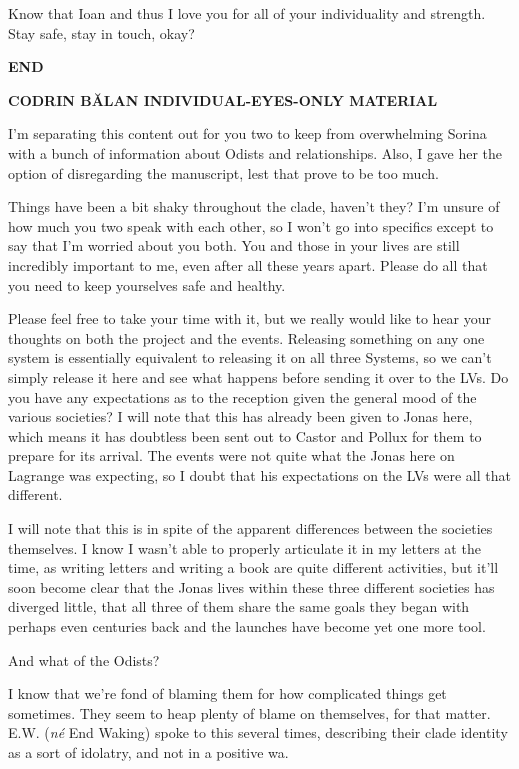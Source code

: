Know that Ioan and thus I love you for all of your individuality and strength. Stay safe, stay in touch, okay?

\textbf{END}

\textbf{CODRIN BĂLAN INDIVIDUAL-EYES-ONLY MATERIAL}

I'm separating this content out for you two to keep from overwhelming Sorina with a bunch of information about Odists and relationships. Also, I gave her the option of disregarding the manuscript, lest that prove to be too much.

Things have been a bit shaky throughout the clade, haven't they? I'm unsure of how much you two speak with each other, so I won't go into specifics except to say that I'm worried about you both. You and those in your lives are still incredibly important to me, even after all these years apart. Please do all that you need to keep yourselves safe and healthy.

Please feel free to take your time with it, but we really would like to hear your thoughts on both the project and the events. Releasing something on any one system is essentially equivalent to releasing it on all three Systems, so we can't simply release it here and see what happens before sending it over to the LVs. Do you have any expectations as to the reception given the general mood of the various societies? I will note that this has already been given to Jonas here, which means it has doubtless been sent out to Castor and Pollux for them to prepare for its arrival. The events were not quite what the Jonas here on Lagrange was expecting, so I doubt that his expectations on the LVs were all that different.

I will note that this is in spite of the apparent differences between the societies themselves. I know I wasn't able to properly articulate it in my letters at the time, as writing letters and writing a book are quite different activities, but it'll soon become clear that the Jonas lives within these three different societies has diverged little, that all three of them share the same goals they began with perhaps even centuries back and the launches have become yet one more tool.

And what of the Odists?

I know that we're fond of blaming them for how complicated things get sometimes. They seem to heap plenty of blame on themselves, for that matter. E.W. (\emph{né} End Waking) spoke to this several times, describing their clade identity as a sort of idolatry, and not in a positive wa.

